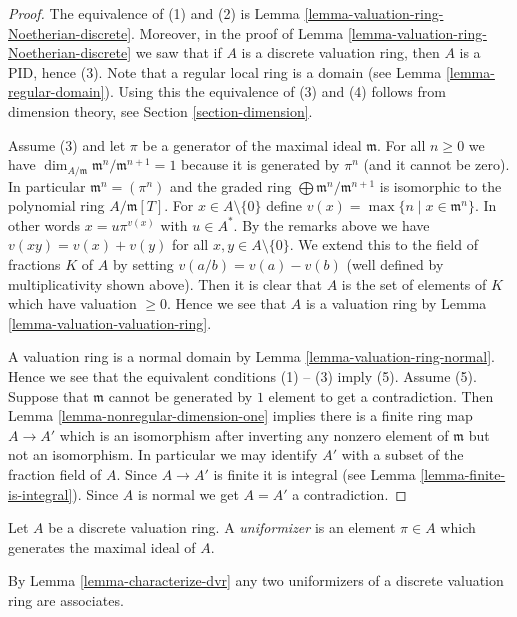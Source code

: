 \begin{proof}
The equivalence of (1) and (2) is
Lemma \ref{lemma-valuation-ring-Noetherian-discrete}.
Moreover, in the proof of Lemma \ref{lemma-valuation-ring-Noetherian-discrete}
we saw that if $A$ is a discrete valuation ring, then $A$ is a PID, hence (3).
Note that a regular local ring is a domain (see
Lemma \ref{lemma-regular-domain}). Using this the equivalence of (3) and (4)
follows from dimension theory, see Section \ref{section-dimension}.

\medskip\noindent
Assume (3) and let $\pi$ be a generator of the maximal ideal $\mathfrak m$.
For all $n \geq 0$ we have
$\dim_{A/\mathfrak m} \mathfrak m^n/\mathfrak m^{n + 1} = 1$
because it is generated by $\pi^n$ (and it cannot be zero).
In particular $\mathfrak m^n = (\pi^n)$ and
the graded ring $\bigoplus \mathfrak m^n/\mathfrak m^{n + 1}$
is isomorphic to the polynomial ring $A/\mathfrak m[T]$.
For $x \in A \setminus \{0\}$ define
$v(x) = \max\{n \mid x \in \mathfrak m^n\}$.
In other words $x = u \pi^{v(x)}$ with $u \in A^*$.
By the remarks above we have $v(xy) = v(x) + v(y)$
for all $x, y \in A \setminus \{0\}$. We extend this to the field of fractions
$K$ of $A$ by setting $v(a/b) = v(a) - v(b)$ (well defined by multiplicativity
shown above). Then it is clear that $A$ is the set of elements of
$K$ which have valuation $\geq 0$. Hence we see that $A$ is a
valuation ring by Lemma \ref{lemma-valuation-valuation-ring}.

\medskip\noindent
A valuation ring is a normal domain by Lemma \ref{lemma-valuation-ring-normal}.
Hence we see that the equivalent conditions (1) -- (3) imply
(5). Assume (5). Suppose that $\mathfrak m$ cannot be generated
by $1$ element to get a contradiction.
Then Lemma \ref{lemma-nonregular-dimension-one} implies there is a finite
ring map $A \to A'$ which is an isomorphism after inverting
any nonzero element of $\mathfrak m$ but not an isomorphism.
In particular we may identify $A'$ with a subset of the fraction field of $A$.
Since $A \to A'$ is finite it is integral (see
Lemma \ref{lemma-finite-is-integral}).
Since $A$ is normal we get $A = A'$ a contradiction.
\end{proof}

\begin{definition}
\label{definition-uniformizer}
Let $A$ be a discrete valuation ring. A {\it uniformizer} is an element
$\pi \in A$ which generates the maximal ideal of $A$.
\end{definition}

\noindent
By Lemma \ref{lemma-characterize-dvr} any two uniformizers of a discrete
valuation ring are associates.

